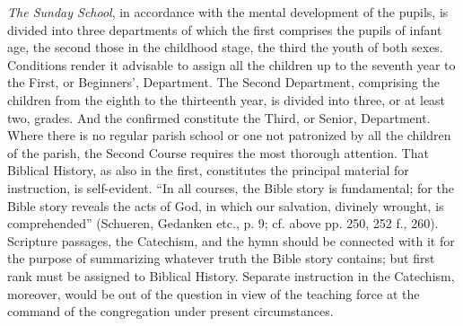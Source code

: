 \emph{The Sunday School}, in accordance with the mental development of the pupils, is divided into three departments of which the first comprises the pupils of infant age, the second those in the childhood stage, the third the youth of both sexes. Conditions render it advisable to assign all the children up to the seventh year to the First, or Beginners’, Department. The Second Department, comprising the children from the eighth to the thirteenth year, is divided into three, or at least two, grades. And the confirmed constitute the Third, or Senior, Department. Where there is no regular parish school
or one not patronized by all the children of the parish, the Second Course requires the most thorough attention. That Biblical History, as also in the first, constitutes the principal material for instruction, is self-evident. “In all courses, the Bible story is fundamental; for the Bible story reveals the acts of God, in which our salvation, divinely wrought, is comprehended” (Schueren, Gedanken etc., p. 9; cf. above pp. 250, 252 f., 260). Scripture passages, the Catechism, and the hymn should be connected with it for the purpose of summarizing whatever truth the Bible story contains; but first rank must be assigned to Biblical History. Separate instruction in the Catechism, moreover, would be out of the question in view of the teaching force at the command of the congregation under present circumstances.


